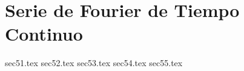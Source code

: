 \documentclass[class=book, crop=false]{standalone}
\begin{document}
\ifstandalone 
  \setcounter{chapter}{4}
  \chapter{Serie de Fourier de Tiempo Continuo}
  \chapterversion
\else
  \setcounter{chapter}{5}
\fi
\label{cap05}

{sec51.tex}
{sec52.tex}
{sec53.tex}
{sec54.tex}
{sec55.tex}
\end{document}

